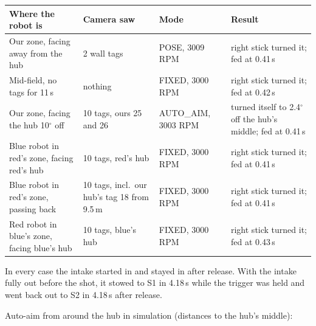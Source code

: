 \documentclass[11pt]{article}
\begin{document}
\begin{xltabular}{\linewidth}{>{\raggedright\arraybackslash}p{5.0cm} L >{\raggedright\arraybackslash}p{2.6cm} L}
\toprule
\textbf{Where the robot is} & \textbf{Camera saw} & \textbf{Mode} & \textbf{Result} \\
\midrule
\endhead
Our zone, facing away from the hub & 2 wall tags & POSE, 3009 RPM & right stick turned it; fed at 0.41\,s \\
Mid-field, no tags for 11\,s & nothing & FIXED, 3000 RPM & right stick turned it; fed at 0.42\,s \\
Our zone, facing the hub 10$^\circ$ off & 10 tags, ours 25 and 26 & AUTO\_AIM, 3003 RPM & turned itself to 2.4$^\circ$ off the hub's middle; fed at 0.41\,s \\
Blue robot in red's zone, facing red's hub & 10 tags, red's hub & FIXED, 3000 RPM & right stick turned it; fed at 0.41\,s \\
Blue robot in red's zone, passing back & 10 tags, incl.\ our hub's tag 18 from 9.5\,m & FIXED, 3000 RPM & right stick turned it; fed at 0.41\,s \\
Red robot in blue's zone, facing blue's hub & 10 tags, blue's hub & FIXED, 3000 RPM & right stick turned it; fed at 0.43\,s \\
\bottomrule
\end{xltabular}

In every case the intake started in and stayed in after release. With the intake fully out before
the shot, it stowed to S1 in 4.18\,s while the trigger was held and went back out to S2 in 4.18\,s
after release.

Auto-aim from around the hub in simulation (distances to the hub's middle):
\end{document}

